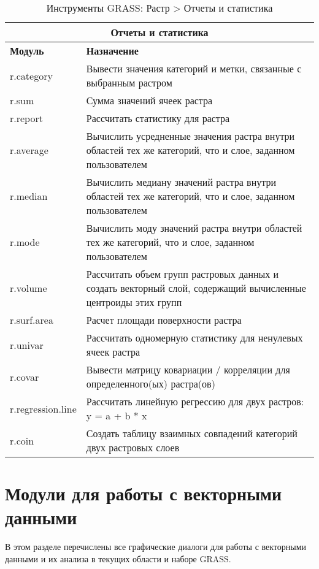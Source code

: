 {\renewcommand{\arraystretch}{0.7}
\begin{table}[H]
\centering
 \begin{tabular}{|p{4cm}|p{11cm}|}
  \hline \multicolumn{2}{|c|}{\textbf{Отчеты и статистика}} \\
  \hline \textbf{Модуль} & \textbf{Назначение} \\
  \hline r.category & Вывести значения категорий и метки, связанные с
  выбранным растром \\
  \hline r.sum & Сумма значений ячеек растра \\
  \hline r.report & Рассчитать статистику для растра \\
  \hline r.average & Вычислить усредненные значения растра внутри областей
  тех же категорий, что и слое, заданном пользователем \\
  \hline r.median & Вычислить медиану значений растра внутри областей тех
  же категорий, что и слое, заданном пользователем \\
  \hline r.mode & Вычислить моду значений растра внутри областей тех же
  категорий, что и слое, заданном пользователем \\
  \hline r.volume & Рассчитать объем групп растровых данных и создать
  векторный слой, содержащий вычисленные центроиды этих групп \\
  \hline r.surf.area & Расчет площади поверхности растра \\
  \hline r.univar & Рассчитать одномерную статистику для ненулевых ячеек
  растра \\
  \hline r.covar & Вывести матрицу ковариации / корреляции для
  определенного(ых) растра(ов) \\
  \hline r.regression.line & Рассчитать линейную регрессию для двух
  растров: y = a + b * x \\
  \hline r.coin & Создать таблицу взаимных совпадений категорий двух
  растровых слоев \\
\hline
\end{tabular}
\caption{Инструменты GRASS: Растр > Отчеты и статистика}
\end{table}}

\clearpage

\section{Модули для работы с векторными данными}

В этом разделе перечислены все графические диалоги для работы с
векторными данными и их анализа в текущих области и наборе GRASS.

